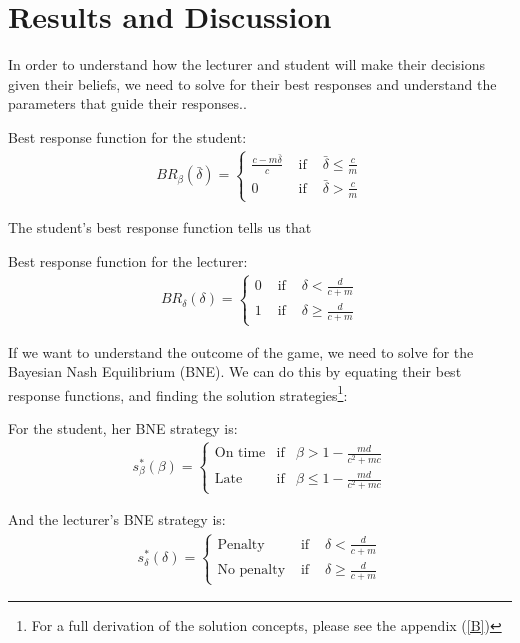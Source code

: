 \documentclass[11pt,preprint, authoryear]{elsarticle}
\numberwithin{equation}{section}
\numberwithin{figure}{section}
\numberwithin{table}{section}
\let\rmarkdownfootnote\footnote%
\def\footnote{\protect\rmarkdownfootnote}
\begin{document}
\hypertarget{results-and-discussion}{%
\section{\texorpdfstring{Results and Discussion
\label{result}}{Results and Discussion }}\label{results-and-discussion}}

In order to understand how the lecturer and student will make their
decisions given their beliefs, we need to solve for their best responses
and understand the parameters that guide their responses..

Best response function for the student: \begin{align*}
B R_{\beta}(\bar{\delta})=\left\{\begin{array}{lll}
\frac{c-m\bar{\delta}}{c} & \text { if } & \bar{\delta}\leq \frac{c}{m} \\
0 & \text { if } & \bar{\delta}> \frac{c}{m}
\end{array}\right.
\end{align*}

The student's best response function tells us that

Best response function for the lecturer: \begin{align*}
B R_{\delta}(\delta)=\left\{\begin{array}{lll}
0 & \text { if } & \delta<\frac{d}{c+m} \\
1 & \text { if } & \delta \geq \frac{d}{c+m}
\end{array}\right.
\end{align*}

If we want to understand the outcome of the game, we need to solve for
the Bayesian Nash Equilibrium (BNE). We can do this by equating their
best response functions, and finding the solution strategies\footnote{For
  a full derivation of the solution concepts, please see the appendix
  (\ref{B})}:

For the student, her BNE strategy is: \begin{align*}
s_{\beta}^{*}(\beta)=\left\{\begin{array}{lll}
\text{On time} & \text{if} & \beta>1-\frac{m d}{c^{2}+m c}  \\
\text{Late} & \text{if} & \beta \leq 1-\frac{m d}{c^{2}+m c} 
\end{array}\right.
\end{align*}

And the lecturer's BNE strategy is: \begin{align*}
s_{\delta}^{*}(\delta)=\left\{\begin{array}{lll}
\text{Penalty} & \text { if } & \delta<\frac{d}{c+m} \\
\text{No penalty} & \text { if } & \delta \geq \frac{d}{c+m}
\end{array}\right.
\end{align*}
\end{document}
